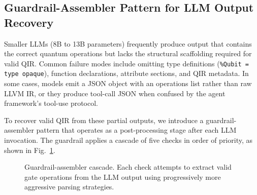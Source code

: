 \documentclass[conference]{IEEEtran}
\begin{document}
\subsection{Guardrail-Assembler Pattern for LLM Output Recovery}\label{sec:guardrail}

Smaller LLMs (8B to 13B parameters) frequently produce output that contains the correct quantum operations but lacks the structural scaffolding required for valid QIR. Common failure modes include omitting type definitions (\texttt{\%Qubit = type opaque}), function declarations, attribute sections, and QIR metadata. In some cases, models emit a JSON object with an operations list rather than raw LLVM IR, or they produce tool-call JSON when confused by the agent framework's tool-use protocol.

To recover valid QIR from these partial outputs, we introduce a guardrail-assembler pattern that operates as a post-processing stage after each LLM invocation. The guardrail applies a cascade of five checks in order of priority, as shown in Fig.~\ref{fig:guardrail}.

\begin{figure}[htbp]
\centering
{}
\caption{Guardrail-assembler cascade. Each check attempts to extract valid gate operations from the LLM output using progressively more aggressive parsing strategies.}
\label{fig:guardrail}
\end{figure}
\end{document}
